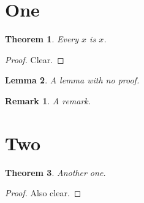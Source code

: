 \documentclass{article}
\newtheorem{theorem}{Theorem}[section]
\newtheorem{lemma}[theorem]{Lemma}
\newtheorem*{remark}{Remark}
\begin{document}
\section{One}
\begin{theorem}\label{thm:a}
Every $x$ is $x$.
\end{theorem}
\begin{proof}
Clear.
\end{proof}
\begin{lemma}
A lemma with no proof.
\end{lemma}
\begin{remark}
A remark.
\end{remark}
\section{Two}
\begin{theorem}
Another one.
\end{theorem}
\begin{proof}
Also clear.
\end{proof}
\end{document}
